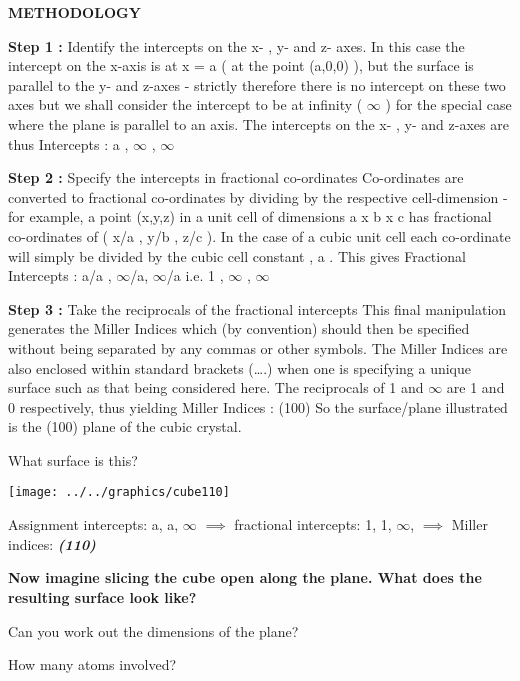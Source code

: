 \documentclass[ignorenonframetext]{beamer}
\begin{document}
\textbf{METHODOLOGY}\medskip 

\textbf{Step 1 :}  Identify the intercepts on the x- , y- and z- axes. 
In this case the intercept on the x-axis is at x = a ( at the point (a,0,0) ), but the surface is parallel to the y- and z-axes - strictly therefore there is no intercept on these two axes but we shall consider the intercept to be at infinity ( \(\infty\) ) for the special case where the plane is parallel to an axis. The intercepts on the x- , y- and z-axes are thus 
Intercepts :    a , \(\infty\) , \(\infty\)

\smallskip \textbf{Step 2 :}  Specify the intercepts in fractional co-ordinates 
Co-ordinates are converted to fractional co-ordinates by dividing by the respective cell-dimension - for example, a point (x,y,z) in a unit cell of dimensions  a x b x c  has fractional co-ordinates of ( x/a , y/b , z/c ). In the case of a cubic unit cell each co-ordinate will simply be divided by the cubic cell constant , a . This gives 
Fractional Intercepts :    a/a , \(\infty\)/a, \(\infty\)/a    i.e.    1 , \(\infty\) , \(\infty\)

\smallskip \textbf{Step 3 :}  Take the reciprocals of the fractional intercepts 
This final manipulation generates the Miller Indices which (by convention) should then be specified without being separated by any commas or other symbols. The Miller Indices are also enclosed within standard brackets (….) when one is specifying a unique surface such as that being considered here. 
The reciprocals of 1 and \(\infty\) are 1 and 0 respectively, thus yielding 
Miller Indices :   (100) So the surface/plane illustrated is the (100) plane of the cubic crystal.

\begin{example}{What surface is this?}
\begin{frame}
\texttt{[image: ../../graphics/cube110]}
\label{110}
\end{frame}
Assignment intercepts: a, a, \(\infty\) \(\implies\) fractional intercepts: 1, 1, \(\infty\), \(\implies\) Miller indices: \textbf{\textit{(110)}}

{\bfseries Now imagine slicing the cube open along the plane. What does the resulting surface look like?

Can you work out the dimensions of the plane?

How many atoms involved?}

\end{example}
\end{document}
